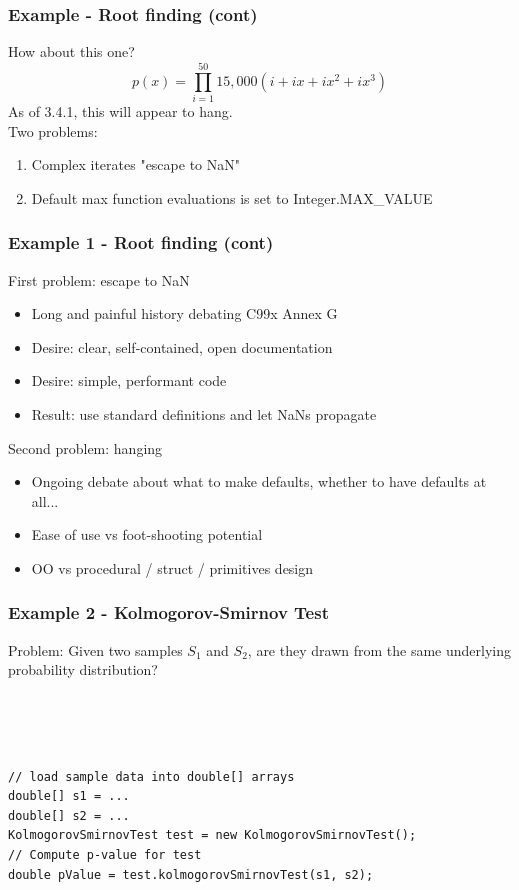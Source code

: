 \documentclass[14pt,mathserif]{beamer}
\begin{document}
\begin{frame}[fragile]
  \frametitle{Example - Root finding (cont)}

How about this one? \[p(x) = \prod\limits_{i=1}^{50}{15,000(i + ix + ix^2 + ix^3)}\]
As of 3.4.1, this will appear to hang.\\
Two problems:
\begin{enumerate}
  \item Complex iterates "escape to NaN"
  \item Default max function evaluations is set to Integer.MAX\_VALUE
\end{enumerate}
\end{frame}

\begin{frame}[fragile]
  \frametitle{Example 1 - Root finding (cont)}

\begin{small}  
 First problem:  escape to NaN
\begin{itemize}
  \item Long and painful history debating C99x Annex G
  \item Desire: clear, self-contained, open documentation
  \item Desire: simple, performant code
  \item Result: use standard definitions and let NaNs propagate
\end{itemize}
Second problem: hanging
\begin{itemize}
  \item Ongoing debate about what to make defaults, whether to have defaults at all...
  \item Ease of use vs foot-shooting potential
  \item OO vs procedural / struct / primitives design
\end{itemize}
\end{small}
\end{frame} 
\begin{frame}[fragile]
  \frametitle{Example 2 - Kolmogorov-Smirnov Test}

\begin{small}
Problem:  Given two samples \(S_1\) and \(S_2\), are they drawn from the same underlying
probability distribution?
\end{small}
\\
\\
\begin{verbatim}

// load sample data into double[] arrays
double[] s1 = ... 
double[] s2 = ...
KolmogorovSmirnovTest test = new KolmogorovSmirnovTest();
// Compute p-value for test
double pValue = test.kolmogorovSmirnovTest(s1, s2);

\end{verbatim}
\end{frame}
\end{document}
